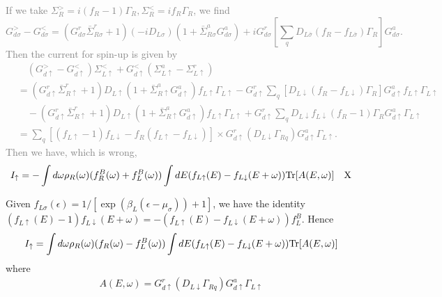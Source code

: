 \documentclass[aps,prb,superscriptaddress]{revtex4-2}
\begin{document}
\textcolor{gray}{
If we take $\Sigma_R^{>}=i(f_R-1)\Gamma_R, \Sigma_R^{<}=if_R\Gamma_R$, we find
\begin{equation}
G^>_{d\sigma} - G^<_{d\sigma} = (G^r_{d\sigma}{\bar \Sigma}_{R\sigma}^r+1) (-iD_{L\sigma}) (1+{\bar \Sigma}_{R\sigma}^a
G^a_{d\sigma}) + i G^r_{d\sigma}[ \sum_q D_{L\bar\sigma}(f_{R}-f_{L\bar\sigma})\Gamma_R ] G^a_{d\sigma}.
\end{equation}
Then the current for spin-up is given by
\begin{equation}
\begin{split}
&\quad(G_{d\uparrow}^>-G_{d\uparrow}^< )\Sigma_{L\uparrow}^< +G_{d\uparrow}^< (\Sigma_{L\uparrow}^a-\Sigma_{L\uparrow}^r) \\
&= (G^r_{d\uparrow}{\bar \Sigma}_{R\uparrow}^r+1) D_{L\uparrow} (1+{\bar \Sigma}_{R\uparrow}^a G^a_{d\uparrow})f_{L\uparrow}\Gamma_{L\uparrow} - G^r_{d\uparrow} \sum_q [D_{L\downarrow}(f_{R}-f_{L\downarrow})\Gamma_{R}] G^a_{d\uparrow} f_{L\uparrow}\Gamma_{L\uparrow} \\
&\quad - (G^r_{d\uparrow}{\bar \Sigma}_{R\uparrow}^r+1) D_{L\uparrow} (1+{\bar \Sigma}_{R\uparrow}^a G^a_{d\uparrow}) f_{L\uparrow}\Gamma_{L\uparrow} + G^r_{d\uparrow} \sum_q D_{L\downarrow}f_{L\downarrow}(f_R-1)\Gamma_R G^a_{d\uparrow} \Gamma_{L\uparrow} \\
& =\sum_q [(f_{L\uparrow}-1)f_{L\downarrow} - f_R(f_{L\uparrow}-f_{L\downarrow})] \times G^r_{d\uparrow} (D_{L\downarrow} \Gamma_{Rq}) G^a_{d\uparrow}\Gamma_{L\uparrow}.
\end{split}
\end{equation}
Then we have, which is wrong,
\begin{eqnarray}
I_\uparrow = -\int d\omega \rho_R(\omega) (f^B_R(\omega)+f^B_L(\omega))\int dE (f_{L\uparrow}(E)-f_{L\downarrow}(E+\omega)) {\rm Tr}[A(E,\omega)]\quad \rm X
\end{eqnarray}}

Given $f_{L\sigma}(\epsilon) = 1/[\exp(\beta_L (\epsilon-\mu_\sigma))+1]$, we have the identity $(f_{L\uparrow}(E)-1)f_{L\downarrow}(E+\omega)= -(f_{L\uparrow}(E)-f_{L\downarrow}(E+\omega))f^B_L$. Hence
\begin{eqnarray}\label{eq:Iup}
I_\uparrow = \int d\omega \rho_R(\omega) (f_R(\omega)-f^B_L(\omega))\int dE (f_{L\uparrow}(E)-f_{L\downarrow}(E+\omega)) {\rm Tr}[A(E,\omega)] \label{spin5}
\end{eqnarray}
where
\begin{eqnarray}
A(E,\omega)=G^r_{d\uparrow} (D_{L\downarrow} \Gamma_{Rq}) G^a_{d\uparrow}\Gamma_{L\uparrow} \nonumber
\end{eqnarray}
\end{document}
